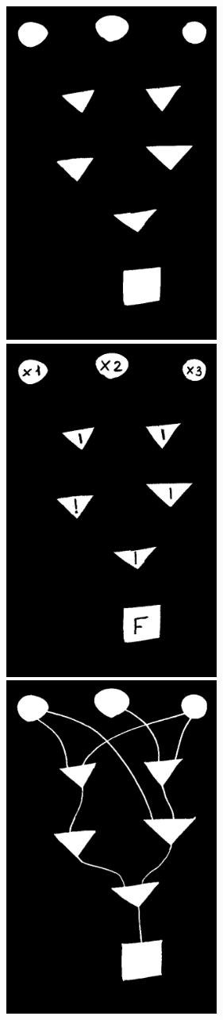 \documentclass[makeidx, a4paper, 14pt]{extarticle}
\begin{document}
\begin{figure}[H]
    \centering
    \includegraphics[width=70mm]{handwritten_1_vertices_pixels.png}
    \includegraphics[width=70mm]{handwritten_1_masked.png}
    \includegraphics[width=70mm]{handwritten_1_processed_image.png}

\end{figure}
\end{document}
